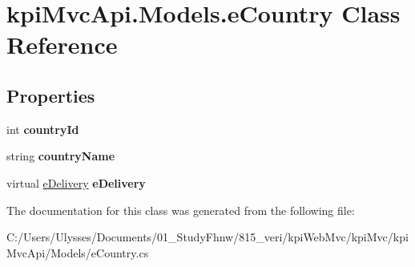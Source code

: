 \hypertarget{classkpi_mvc_api_1_1_models_1_1e_country}{}\section{kpi\+Mvc\+Api.\+Models.\+e\+Country Class Reference}
\label{classkpi_mvc_api_1_1_models_1_1e_country}
\subsection*{Properties}
\begin{DoxyCompactItemize}
\item 
\mbox{\label{classkpi_mvc_api_1_1_models_1_1e_country_a574bfeec30235e95f5c84a3c4d2cf778}} 
int {\bfseries country\+Id}
\item 
\mbox{\label{classkpi_mvc_api_1_1_models_1_1e_country_a2841c06a0b82ebf3c7b005bd1bc27b62}} 
string {\bfseries country\+Name}
\item 
\mbox{\label{classkpi_mvc_api_1_1_models_1_1e_country_a5e7b1a3c01169934b56d14186b4cc22e}} 
virtual \hyperlink{classkpi_mvc_api_1_1_models_1_1e_delivery}{e\+Delivery} {\bfseries e\+Delivery}
\end{DoxyCompactItemize}


The documentation for this class was generated from the following file\+:\begin{DoxyCompactItemize}
\item 
C\+:/\+Users/\+Ulysses/\+Documents/01\+\_\+\+Study\+Fhnw/815\+\_\+veri/kpi\+Web\+Mvc/kpi\+Mvc/kpi\+Mvc\+Api/\+Models/e\+Country.\+cs\end{DoxyCompactItemize}
